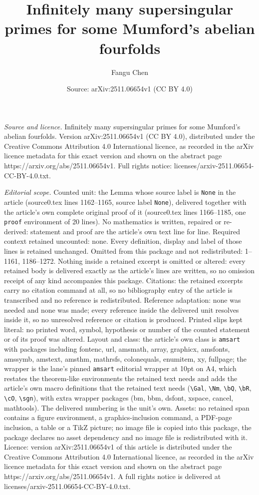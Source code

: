 \documentclass[10pt,a4paper]{amsart}
\title[Infinitely many supersingular primes for some Mumford's abel]{Infinitely many supersingular primes for some Mumford's abelian fourfolds}
\author{Fangu Chen}
\date{Source: arXiv:2511.06654v1 (CC BY 4.0)}
\begin{document}
\maketitle

\noindent\emph{Source and licence.} Infinitely many supersingular primes for some Mumford's abelian fourfolds. Version arXiv:2511.06654v1 (CC BY 4.0), distributed under the Creative Commons Attribution 4.0 International licence, as recorded in the arXiv licence metadata for this exact version and shown on the abstract page https://arxiv.org/abs/2511.06654v1. Full rights notice: licenses/arxiv-2511.06654-CC-BY-4.0.txt.\par\smallskip

\noindent\textit{Editorial scope.} Counted unit: the Lemma whose source label is \texttt{None} in the article (source0.tex lines 1162--1165, source label \texttt{None}), delivered together with the article's own complete original proof of it (source0.tex lines 1166--1185, one \texttt{proof} environment of 20 lines). No mathematics is written, repaired or re-derived: statement and proof are the article's own text line for line. Required context retained uncounted: none. Every definition, display and label of those lines is retained unchanged. Omitted from this package and not redistributed: 1--1161, 1186--1272. Nothing inside a retained excerpt is omitted or altered: every retained body is delivered exactly as the article's lines are written, so no omission receipt of any kind accompanies this package. Citations: the retained excerpts carry no citation command at all, so no bibliography entry of the article is transcribed and no reference is redistributed. Reference adaptation: none was needed and none was made; every reference inside the delivered unit resolves inside it, so no unresolved reference or citation is produced. Printed slips kept literal: no printed word, symbol, hypothesis or number of the counted statement or of its proof was altered. Layout and class: the article's own class is \texttt{amsart} with packages including fontenc, url, amsmath, array, graphicx, amsfonts, amssymb, amstext, amsthm, mathrsfs, colonequals, enumitem, xy, fullpage; the wrapper is the lane's pinned \texttt{amsart} editorial wrapper at 10pt on A4, which restates the theorem-like environments the retained text needs and adds the article's own macro definitions that the retained text needs (\texttt{\textbackslash Gal}, \texttt{\textbackslash Nm}, \texttt{\textbackslash bQ}, \texttt{\textbackslash bR}, \texttt{\textbackslash cO}, \texttt{\textbackslash sgn}), with extra wrapper packages (bm, bbm, dsfont, xspace, cancel, mathtools). The delivered numbering is the unit's own. Assets: no retained span contains a figure environment, a graphics-inclusion command, a PDF-page inclusion, a table or a TikZ picture; no image file is copied into this package, the package declares no asset dependency and no image file is redistributed with it. Licence: version arXiv:2511.06654v1 of this article is distributed under the Creative Commons Attribution 4.0 International licence, as recorded in the arXiv licence metadata for this exact version and shown on the abstract page https://arxiv.org/abs/2511.06654v1. A full rights notice is delivered at licenses/arxiv-2511.06654-CC-BY-4.0.txt. 
\end{document}
